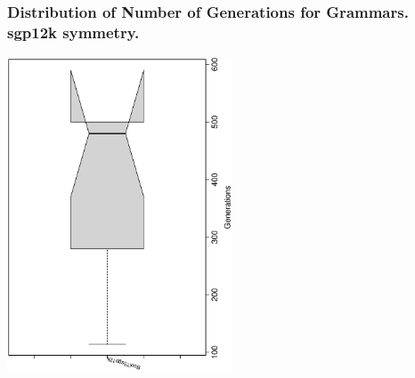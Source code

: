  \begin{frame}
 \frametitle{ Distribution of Number of Generations for Grammars. sgp12k  symmetry. }
 \begin{center}
\includegraphics[width=0.5\textwidth, angle=-90]
{ExpFboxplottGenerations010.eps}
 \end{center}
 \label{ExpFboxplottGenerations010.eps}  
 \end{frame}

